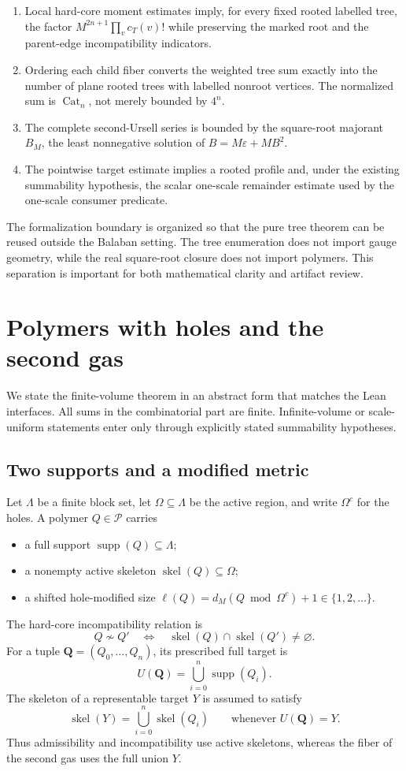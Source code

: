 \documentclass[11pt,a4paper]{article}
\theoremstyle{definition}
\newcommand{\supp}{\operatorname{supp}}
\newcommand{\skel}{\operatorname{skel}}
\newcommand{\Cat}{\operatorname{Cat}}
\newcommand{\Poly}{\mathcal P}
\newcommand{\eps}{\varepsilon}
\begin{document}
\begin{enumerate}
\item Local hard-core moment estimates imply, for every fixed rooted labelled tree, the
      factor $M^{2n+1}\prod_v c_T(v)!$ while preserving the marked root and the
      parent-edge incompatibility indicators.
\item Ordering each child fiber converts the weighted tree sum exactly into the number
      of plane rooted trees with labelled nonroot vertices.  The normalized sum is
      $\Cat_n$, not merely bounded by $4^n$.
\item The complete second-Ursell series is bounded by the square-root majorant $B_M$,
      the least nonnegative solution of $B=M\eps+MB^2$.
\item The pointwise target estimate implies a rooted profile and, under the existing
      summability hypothesis, the scalar one-scale remainder estimate used by the
      one-scale consumer predicate.
\end{enumerate}

The formalization boundary is organized so that the pure tree theorem can be reused outside the
Balaban setting.  The tree enumeration does not import gauge geometry, while the real
square-root closure does not import polymers.  This separation is important for both
mathematical clarity and artifact review.

\section{Polymers with holes and the second gas}
\label{sec:model}

We state the finite-volume theorem in an abstract form that matches the Lean interfaces.
All sums in the combinatorial part are finite.  Infinite-volume or scale-uniform
statements enter only through explicitly stated summability hypotheses.

\subsection{Two supports and a modified metric}

Let $\Lambda$ be a finite block set, let $\Omega\subseteq\Lambda$ be the active region,
and write $\Omega^c$ for the holes.  A polymer $Q\in\Poly$ carries
\begin{itemize}
\item a full support $\supp(Q)\subseteq\Lambda$;
\item a nonempty active skeleton $\skel(Q)\subseteq\Omega$;
\item a shifted hole-modified size
      $\ell(Q)=d_M(Q\bmod\Omega^c)+1\in\{1,2,\ldots\}$.
\end{itemize}
The hard-core incompatibility relation is
\[
  Q\not\sim Q' \quad\Longleftrightarrow\quad
  \skel(Q)\cap\skel(Q')\ne\varnothing.
\]
For a tuple $\bm Q=(Q_0,\ldots,Q_n)$, its prescribed full target is
\[
  U(\bm Q)=\bigcup_{i=0}^{n}\supp(Q_i).
\]
The skeleton of a representable target $Y$ is assumed to satisfy
\[
  \skel(Y)=\bigcup_{i=0}^{n}\skel(Q_i)
  \qquad\text{whenever }U(\bm Q)=Y.
\]
Thus admissibility and incompatibility use active skeletons, whereas the fiber of the
second gas uses the full union $Y$.
\end{document}
